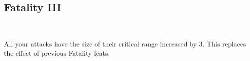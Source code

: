 \subsection*{Fatality III}\label{feat:fatality3}
 \\

All your attacks have the size of their critical range increased by 3. This
replaces the effect of previous Fatality feats.
